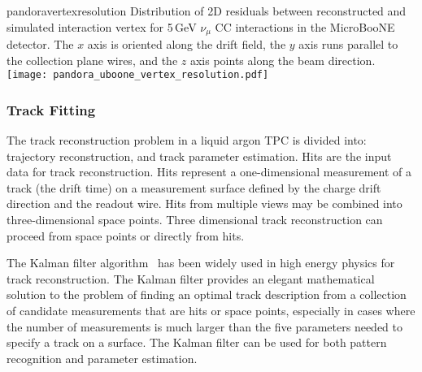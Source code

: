 \begin{cdrfigure}{pandoravertexresolution}
{Distribution of 2D residuals between reconstructed and simulated interaction
 vertex for 5\,GeV $\nu_{\mu}$ CC interactions in the MicroBooNE detector.
 The $x$ axis is oriented along the drift field, the $y$ axis runs parallel 
 to the collection plane wires, and the $z$ axis points along the beam direction.}
\texttt{[image: pandora\_uboone\_vertex\_resolution.pdf]}
\end{cdrfigure}


\subsubsection{Track Fitting}


The track reconstruction problem in a liquid argon TPC is divided
into: trajectory reconstruction, and track parameter estimation.
Hits are the input data for track reconstruction. Hits represent a
one-dimensional measurement of a track (the drift time) on a
measurement surface defined by the charge drift direction and the
readout wire. Hits from multiple views may be combined into
three-dimensional space points. Three dimensional track reconstruction
can proceed from space points or directly from hits.

The Kalman filter algorithm~\cite{kalman} has been widely used in high
energy physics for track reconstruction. The Kalman filter provides an
elegant mathematical solution to the problem of finding an optimal
track description from a collection of candidate measurements that are
hits or space points, especially in cases where the number of
measurements is much larger than the five parameters needed to specify
a track on a surface.  The Kalman filter can be used for both pattern
recognition and parameter estimation.




